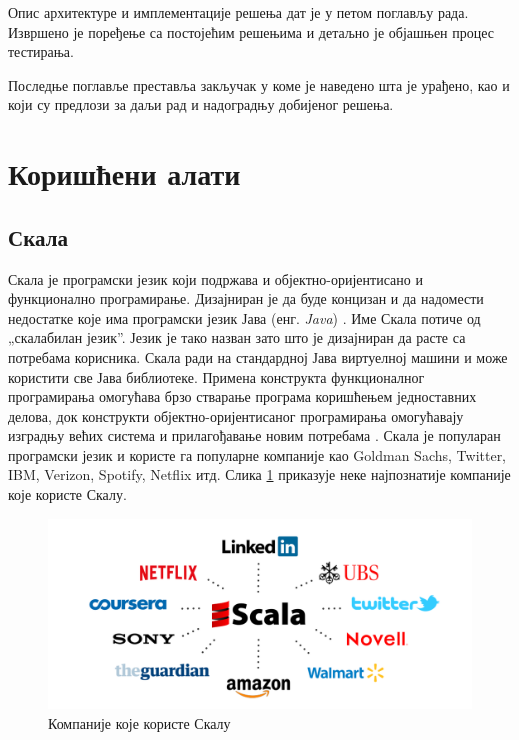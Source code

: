 \documentclass[12pt, a4paper]{article}
\theoremstyle{definition}
\begin{document}
Опис архитектуре и имплементације решења дат је у петом поглављу рада. Извршено је поређење са постојећим решењима и детаљно је објашњен процес тестирања.

Последње поглавље преставља закључак у коме је наведено шта је урађено, као и који су предлози за даљи рад и надоградњу добијеног решења.



\newpage

\section{Коришћени алати}
\subsection{Скала}
Скала је програмски језик који подржава и објектно-оријентисано и функционално програмирање. Дизајниран је да буде концизан и да надомести недостатке које има програмски језик Јава (енг. \textit{Java}) \cite{wiki_scala}.
Име Скала потиче од „скалабилан језик”. Језик је тако назван зато што је дизајниран да расте са потребама корисника. Скала ради на стандардној Јава виртуелној машини и може користити све Јава библиотеке. Примена конструкта функционалног програмирања омогућава брзо стварање програма коришћењем једноставних делова, док конструкти објектно-оријентисаног програмирања омогућавају изградњу већих система и прилагођавање новим потребама \cite{odersky2016}.
Скала је популаран програмски језик и користе га популарне компаније као Goldman Sachs, Twitter, IBM, Verizon, Spotify, Netflix итд. Слика \ref{fig:scalaCompanies} приказује неке најпознатије компаније које користе Скалу.

\begin{figure}[H]
  \centering
      \includegraphics[scale=0.27]{slike/scalaCompanies}
  \caption{Компаније које користе Скалу}
  \label{fig:scalaCompanies}
\end{figure}
\end{document}
